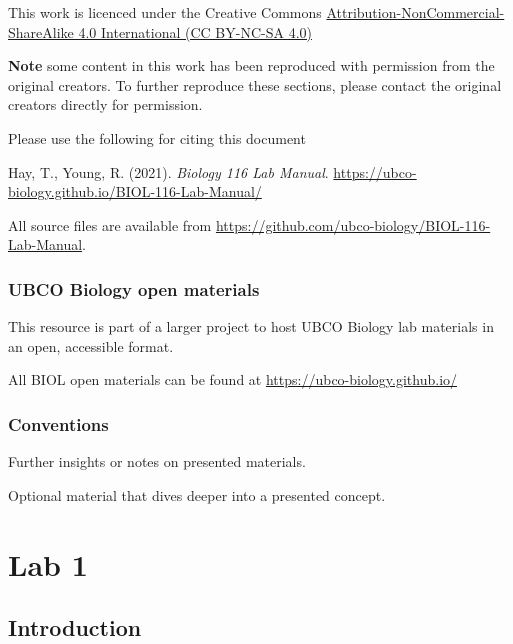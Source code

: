 \documentclass[
]{book}
\begin{document}
This work is licenced under the Creative Commons \href{https://creativecommons.org/licenses/by-nc-sa/4.0/}{Attribution-NonCommercial-ShareAlike 4.0 International (CC BY-NC-SA 4.0)}

\textbf{Note} some content in this work has been reproduced with permission from the original creators. To further reproduce these sections, please contact the original creators directly for permission.

Please use the following for citing this document

Hay, T., Young, R. (2021). \emph{Biology 116 Lab Manual}. \url{https://ubco-biology.github.io/BIOL-116-Lab-Manual/}

All source files are available from \url{https://github.com/ubco-biology/BIOL-116-Lab-Manual}.

\hypertarget{ubco-biology-open-materials}{%
\section*{UBCO Biology open materials}\label{ubco-biology-open-materials}}

This resource is part of a larger project to host UBCO Biology lab materials in an open, accessible format.

All BIOL open materials can be found at \url{https://ubco-biology.github.io/}

\hypertarget{conventions}{%
\section*{Conventions}\label{conventions}}

Further insights or notes on presented materials.

Optional material that dives deeper into a presented concept.

\hypertarget{part-lab-1}{%
\part*{Lab 1}\label{part-lab-1}}

\hypertarget{introduction}{%
\chapter*{Introduction}\label{introduction}}
\end{document}
